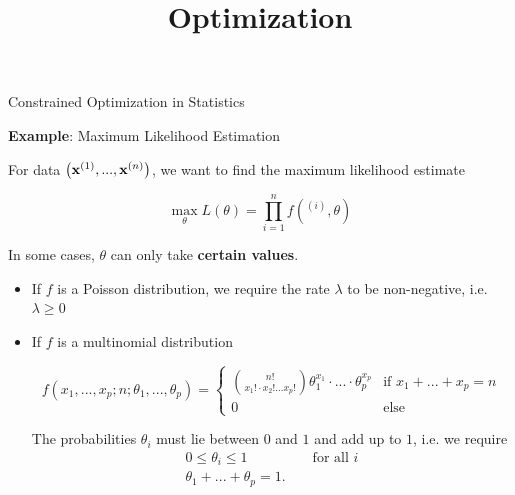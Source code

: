 




\newcommand{\learninggoals}{
\item \textcolor{red}{LEARNING GOAL 1}
\item \textcolor{red}{LEARNING GOAL 1}}



\title{Optimization}



\sloppy


\begin{vbframe}{Constrained Optimization in Statistics}

\textbf{Example}: Maximum Likelihood Estimation

\lz

For data $\left(\mathbf{x}^{(1)}, ..., \mathbf{x}^{(n)}\right)$, we want to find the maximum likelihood estimate

$$
\max_\theta L(\theta) = \prod_{i = 1}^n f(^{(i)}, \theta)
$$

In some cases, $\theta$ can only take \textbf{certain values}. 

\lz 

\begin{itemize}
\item If $f$ is a Poisson distribution, we require the rate $\lambda$ to be non-negative, i.e. $\lambda \ge 0$

  \item If $f$ is a multinomial distribution

\begin{footnotesize}
  $$
  f(x_1, ..., x_p; n; \theta_1, ..., \theta_p) = \begin{cases} \binom{n!}{x_1! \cdot x_2! ... x_p!} \theta_1^{x_1} \cdot ... \cdot \theta_p^{x_p} & \text{if } x_1 + ... + x_p = n \\ 0 & \text{else}
  \end{cases}
  $$
\end{footnotesize}

  The probabilities $\theta_i$ must lie between $0$ and $1$ and add up to $1$, i.e. we require 
  \begin{eqnarray*}
  	0 \le \theta_i \le 1 && \text{ for all } i \\
  	 \theta_1 + ... + \theta_p = 1. &&
  \end{eqnarray*}

\end{itemize}

\end{vbframe}


